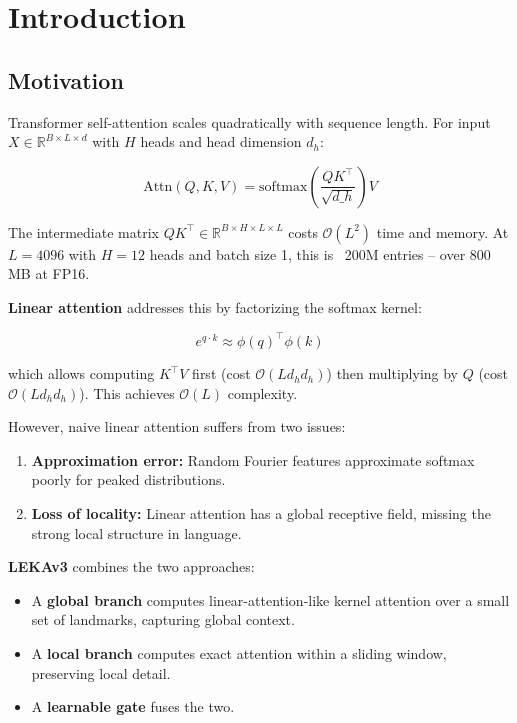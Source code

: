 \section{Introduction}

\subsection{Motivation}

Transformer self-attention scales quadratically with sequence length. For 
input $X \in \mathbb{R}^{B \times L \times d}$ with $H$ heads and head 
dimension $d_h$:

\[
\text{Attn}(Q, K, V) = \text{softmax}\!\left(\frac{Q K^\top}{\sqrt{d\_h}}\right) V
\tag{1.1}
\]

The intermediate matrix $QK^\top \in \mathbb{R}^{B \times H \times L \times L}$ 
costs $\mathcal{O}(L^2)$ time and memory. At $L = 4096$ with $H = 12$ heads 
and batch size 1, this is ~200M entries -- over 800 MB at FP16.

\textbf{Linear attention} addresses this by factorizing the softmax kernel:

\[
e^{q \cdot k} \approx \phi(q)^\top \phi(k)
\tag{1.2}
\]

which allows computing $K^\top V$ first (cost $\mathcal{O}(L d_h d_h)$) then 
multiplying by $Q$ (cost $\mathcal{O}(L d_h d_h)$). This achieves $\mathcal{O}(L)$ 
complexity.

However, naive linear attention suffers from two issues:

\begin{enumerate}
\item \textbf{Approximation error:} Random Fourier features approximate softmax poorly
  for peaked distributions.
\item \textbf{Loss of locality:} Linear attention has a global receptive field, missing
  the strong local structure in language.

\end{enumerate}
\textbf{LEKAv3} combines the two approaches:

\begin{itemize}
\item A \textbf{global branch} computes linear-attention-like kernel attention over
  a small set of landmarks, capturing global context.
\item A \textbf{local branch} computes exact attention within a sliding window,
  preserving local detail.
\item A \textbf{learnable gate} fuses the two.

\end{itemize}
